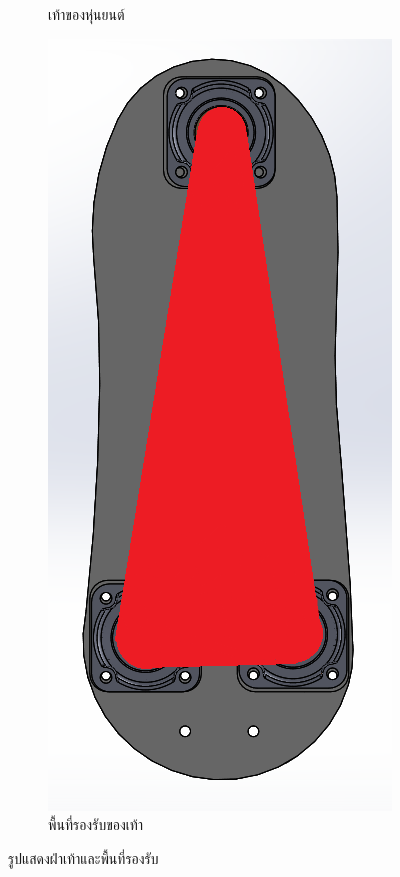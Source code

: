 \begin{figure}[!ht]
\begin{subfigure}[b]{0.2\linewidth}
    \caption{เท้าของหุ่นยนต์}
  \end{subfigure}
  \begin{subfigure}[b]{0.2\linewidth}
    \includegraphics[width=\linewidth]{chapter4/images/foot+FSR_sp.PNG}
    \caption{พื้นที่รองรับของเท้า}
  \end{subfigure}
  \caption{รูปแสดงฝ่าเท้าและพื้นที่รองรับ}
  \label{fig:foot_FSR}
\end{figure}



